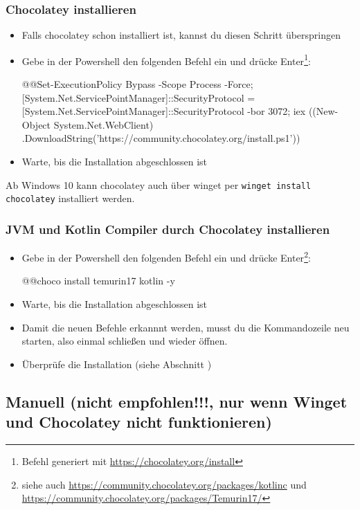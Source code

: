\subsubsection*{Chocolatey installieren}
\begin{itemize}
    \item Falls chocolatey schon installiert ist, kannst du diesen Schritt überspringen
    \item Gebe in der Powershell den folgenden Befehl ein und drücke Enter\footnote{Befehl generiert mit \url{https://chocolatey.org/install}}:
    \begin{commandshell}
        @\shellprefix{}@Set-ExecutionPolicy Bypass -Scope Process -Force; 
        [System.Net.ServicePointManager]::SecurityProtocol = 
        [System.Net.ServicePointManager]::SecurityProtocol -bor 3072; 
        iex ((New-Object System.Net.WebClient)
        .DownloadString('https://community.chocolatey.org/install.ps1'))
    \end{commandshell}
    \item Warte, bis die Installation abgeschlossen ist
\end{itemize}
\begin{hinweis}
    Ab Windows 10 kann chocolatey auch über winget per \texttt{winget install chocolatey} installiert werden.
\end{hinweis}
\subsubsection*{JVM und Kotlin Compiler durch Chocolatey installieren}
\begin{itemize}
    \item Gebe in der Powershell den folgenden Befehl ein und drücke Enter\footnote{siehe auch \url{https://community.chocolatey.org/packages/kotlinc} und \url{https://community.chocolatey.org/packages/Temurin17/}}:
    \begin{commandshell}
        @\shellprefix{}@choco install temurin17 kotlin -y
    \end{commandshell}
    \item Warte, bis die Installation abgeschlossen ist
    \item Damit die neuen Befehle erkannnt werden, musst du die Kommandozeile neu starten, also einmal schließen und wieder öffnen.
    \item Überprüfe die Installation (siehe Abschnitt )
\end{itemize}
\subsection*{Manuell (nicht empfohlen!!!, nur wenn Winget und Chocolatey nicht funktionieren)}
